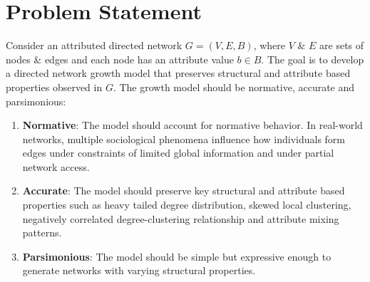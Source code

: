 \section{Problem Statement}
\label{sec:Problem Statement}

Consider an attributed directed network $G=(V,E,B)$, where $V$ \& $E$ are
sets of nodes \& edges and each node has an attribute value $b \in B$.
The goal is to develop a directed network growth model that preserves structural
and attribute based properties observed in $G$. The growth model should be
normative, accurate and parsimonious:
\begin{enumerate}
    \item \textbf{Normative}: The model should account for normative behavior. In real-world
    networks, multiple sociological phenomena influence how individuals form edges under
    constraints of limited global information and under partial network access.
    \item \textbf{Accurate}: The model should preserve key structural
    and attribute based properties such as heavy tailed degree distribution, skewed
    local clustering, negatively correlated degree-clustering relationship
    and attribute mixing patterns.
    \item \textbf{Parsimonious}: The model should be simple but expressive enough to generate
    networks with varying structural properties.
\end{enumerate}


%
